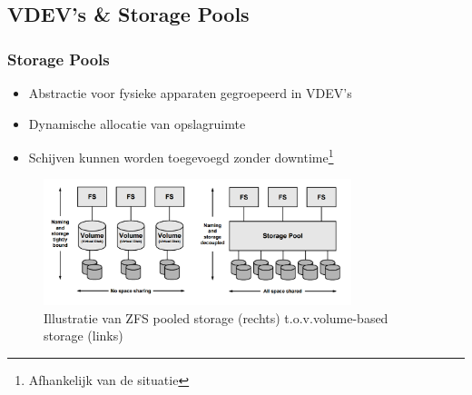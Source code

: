 \documentclass{beamer}
\begin{document}

\subsection{VDEV's \& Storage Pools}


\begin{frame}
  \frametitle{Storage Pools}
  \begin{itemize}
    \item Abstractie voor fysieke apparaten \textbf{\textrightarrow} gegroepeerd in VDEV's
    \item Dynamische allocatie van opslagruimte
    \item Schijven kunnen worden toegevoegd zonder downtime\footnote{Afhankelijk van de situatie}    
  \end{itemize}

  \begin{figure}
    \centering
    \includegraphics[width=0.8\textwidth]{img/h3-pools-vs-vols}
    \caption{Illustratie van ZFS pooled storage (rechts) t.o.v.volume-based storage (links) \autocite{ZFSBonwick}}
    \label{fig:bonwick_pools_illustratie}
    \end{figure}
\end{frame}

\end{document}
